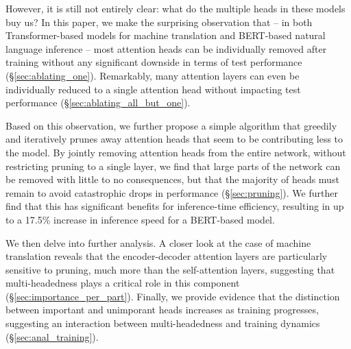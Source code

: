However, it is still not entirely clear: what do the multiple heads in these models buy us?
In this paper, we make the surprising observation that -- in both Transformer-based models for machine translation and BERT-based \citep{devlin2018bert} natural language inference -- most attention heads can be individually removed after training without any significant downside in terms of test performance (\S\ref{sec:ablating_one}).
Remarkably, many attention layers can even be individually reduced to a single attention head without impacting test performance (\S\ref{sec:ablating_all_but_one}). 

Based on this observation, we further propose a simple algorithm that greedily and iteratively prunes away attention heads that seem to be contributing less to the model.
By jointly removing attention heads from the entire network, without restricting pruning to a single layer, we find that large parts of the network can be removed with little to no consequences, but that the majority of heads must remain to avoid catastrophic drops in performance (\S\ref{sec:pruning}).
We further find that this has significant benefits for inference-time efficiency, resulting in up to a 17.5\% increase in inference speed for a BERT-based model.

We then delve into further analysis.
A closer look at the case of machine translation reveals that the encoder-decoder attention layers are particularly sensitive to pruning, much more than the self-attention layers, suggesting that multi-headedness plays a critical role in this component (\S\ref{sec:importance_per_part}). Finally, we provide evidence that the distinction between important and unimporant heads increases as training progresses, suggesting an interaction between multi-headedness and training dynamics (\S\ref{sec:anal_training}).





